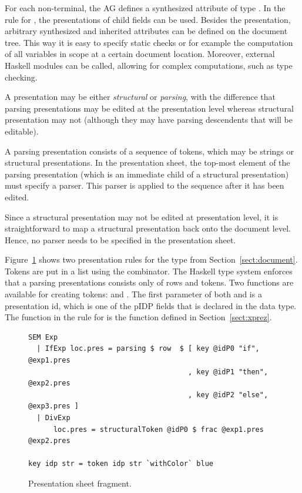 \documentclass[12pt]{article}
\begin{document}
For each non-terminal, the AG defines a synthesized attribute  of type . In the rule for , the presentations of child fields can be used. Besides the presentation, arbitrary synthesized and inherited attributes can be defined on the document tree. This way it is easy to specify static checks or for example the computation of all variables in scope at a certain document location. Moreover, external Haskell modules can be called, allowing for complex computations, such as type checking.


A presentation may be either {\em structural} or {\em parsing}, with the difference that parsing presentations may be edited at the presentation level whereas structural presentation may not (although they may have parsing descendents that will be editable). 

A parsing presentation consists of a sequence of tokens, which may be strings or structural presentations. In the presentation sheet, the top-most element of the parsing presentation (which is an immediate child of a structural presentation) must specify a parser. This parser is applied to the sequence after it has been edited.

Since a structural presentation may not be edited at presentation level, it is straightforward to map a structural presentation back onto the document level. Hence, no parser needs to be specified in the presentation sheet.

Figure~\ref{fig:presentationSheet} shows two presentation rules for the type  from Section~\ref{sect:document}. Tokens are put in a list using the  combinator. The Haskell type system enforces that a parsing presentations consists only of rows and tokens. Two functions are available for creating tokens:  and . The first parameter of both  and  is a presentation id, which is one of the p{IDP} fields that is declared in the data type. The function  in the rule for  is the function defined in Section~\ref{sect:xprez}.


\begin{figure}
\begin{center}
\begin{footnotesize}
\begin{verbatim}
SEM Exp
  | IfExp loc.pres = parsing $ row  $ [ key @idP0 "if",   @exp1.pres
                                      , key @idP1 "then", @exp2.pres
                                      , key @idP2 "else", @exp3.pres ]
  | DivExp
      loc.pres = structuralToken @idP0 $ frac @exp1.pres @exp2.pres
                  
key idp str = token idp str `withColor` blue 
\end{verbatim}%
\end{footnotesize}
\caption{Presentation sheet fragment.} \label{fig:presentationSheet} 
\end{center}
\end{figure}
\end{document}
